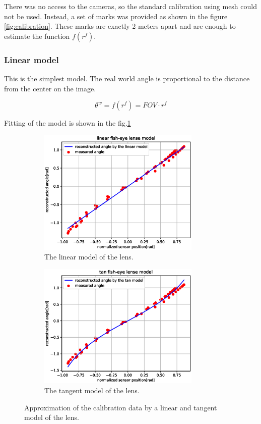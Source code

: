 \documentclass[a4paper,11pt,titlepage,twoside]{article}
\numberwithin{figure}{section}
\begin{document}
There was no access to the cameras, so the standard calibration using mesh could not be used. Instead, a set of marks was provided as shown in the figure \ref{fig:calibration}. These marks are exactly 2 meters apart and are enough to estimate the function $f(r^f)$.

\subsubsection{Linear model}

This is the simplest model. The real world angle is proportional to the distance from the center on the image. 

\begin{equation}
\theta^w = f(r^f) = FOV \cdot r^f
\end{equation}

Fitting of the model is shown in the fig.\ref{fig:linear_model}

\begin{figure}
    \begin{subfigure}[Sample1]{0.5\linewidth}
        \includegraphics[height=60mm]{fig/linear_model3.eps}
        \caption{The linear model of the lens.}
        \label{fig:linear_model}
    \end{subfigure}
    \qquad
    \begin{subfigure}[Sample1]{0.5\linewidth}    
        \includegraphics[height=60mm]{fig/tan_model2.eps}  
        \caption{The tangent model of the lens.}
        \label{fig:tan_model}
    \end{subfigure} 
    \caption{Approximation of the calibration data by a linear and tangent model of the lens.}
\end{figure}
\end{document}
